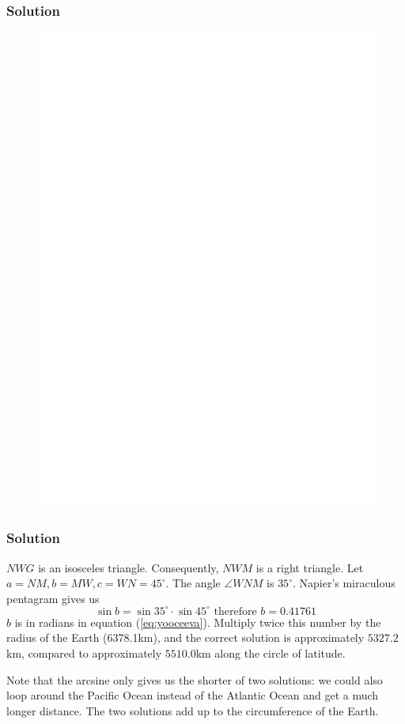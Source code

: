 \documentclass[xcolor=dvipsnames]{beamer}
\begin{document}
\begin{frame}
  \frametitle{Solution}
\begin{figure}[h]
\includegraphics[scale=.55]{./WindsorGrenoble1.eps}
\end{figure}
\end{frame}

\begin{frame}
  \frametitle{Solution}
  $NWG$ is an isosceles triangle. Consequently, $NWM$ is a right
  triangle. Let $a=NM,b=MW,c=WN=45^{\circ}$. The angle $\angle{}WNM$
  is $35^{\circ}$. Napier's miraculous pentagram gives us
\begin{equation}
  \label{eq:yooceeva}
  \sin{}b=\sin{}35^{\circ}\cdot\sin{}45^{\circ}\mbox{ therefore }b=0.41761
\end{equation}
$b$ is in radians in equation (\ref{eq:yooceeva}). Multiply twice this
number by the radius of the Earth (6378.1km), and the correct solution
is approximately $5327.2$km, compared to approximately $5510.0$km
along the circle of latitude.

\bigskip

Note that the arcsine only gives us the
shorter of two solutions: we could also loop around the Pacific Ocean
instead of the Atlantic Ocean and get a much longer distance. The two
solutions add up to the circumference of the Earth.
\end{frame}
\end{document}
